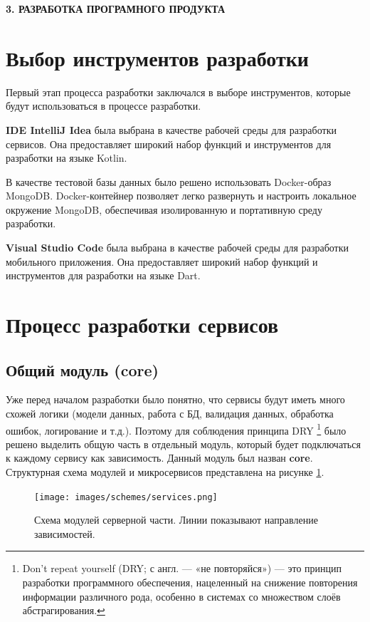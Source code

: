 \newpage
\begin{center}
  \textbf{\large 3. РАЗРАБОТКА ПРОГРАМНОГО ПРОДУКТА}
\end{center}

\section{Выбор инструментов разработки}
Первый этап процесса разработки заключался в выборе инструментов, которые будут использоваться в процессе разработки.

\textbf{IDE IntelliJ Idea} была выбрана в качестве рабочей среды для разработки сервисов.
Она предоставляет широкий набор функций и инструментов для разработки на языке Kotlin.

В качестве тестовой базы данных было решено использовать Docker-образ MongoDB. 
Docker-контейнер позволяет легко развернуть и настроить локальное окружение MongoDB, обеспечивая изолированную и портативную среду разработки. 

\textbf{Visual Studio Code} была выбрана в качестве рабочей среды для разработки мобильного приложения.
Она предоставляет широкий набор функций и инструментов для разработки на языке Dart.

\section{Процесс разработки сервисов}
\subsection{Общий модуль (core)}
Уже перед началом разработки было понятно, что сервисы будут иметь много схожей логики (модели данных, работа с БД, валидация данных, обработка ошибок, логирование и т.д.).
Поэтому для соблюдения принципа DRY 
\footnote{Don’t repeat yourself (DRY; с англ. — «не повторяйся») — это принцип разработки программного обеспечения, нацеленный на снижение повторения информации различного рода, особенно в системах со множеством слоёв абстрагирования.} 
было решено выделить общую часть в отдельный модуль, который будет подключаться к каждому сервису как зависимость. Данный модуль был назван \textbf{core}.
Структурная схема модулей и микросервисов представлена на рисунке \ref{fig:schemes:services}.

\begin{figure}
  \centering
  \texttt{[image: images/schemes/services.png]}
  \caption{Схема модулей серверной части. Линии показывают направление зависимостей.}
  \label{fig:schemes:services}
\end{figure}

